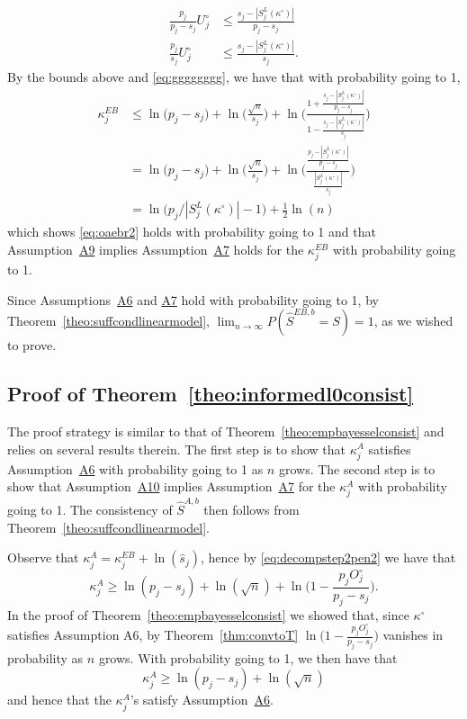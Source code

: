 \documentclass[bj,authoryear]{imsart}
\theoremstyle{plain}
\begin{document}
\begin{align}
    \frac{p_j}{p_j-s_j}U^{\circ}_j &\leq \frac{s_j-|S^{L}_j(\kappa^{\circ})|}{p_j-s_j}\nonumber\\
    \frac{p_j}{s_j}U^{\circ}_j &\leq  \frac{s_j-|S^{L}_j(\kappa^{\circ})|}{s_j}. \label{eq:gewou}
\end{align}
By the bounds above and \eqref{eq:gggggggg}, we have that with probability going to 1,
\begin{align*}
  \kappa^{EB}_j 
  &\leq \ln\big(p_j-s_j\big)+\ln\Big(\frac{\sqrt{n}}{s_j}\Big)+\ln\Bigg(\frac{1+\frac{s_j-|S^{L}_j(\kappa^{\circ})|}{p_j-s_j}}{1- \frac{s_j-|S^{L}_j(\kappa^{\circ})|}{s_j}}\Bigg) \nonumber\\
  &= \ln\big(p_j-s_j\big) + \ln\Big(\frac{\sqrt{n}}{s_j}\Big) + \ln\Bigg(\frac{\frac{p_j-|S^{L}_j(\kappa^{\circ})|}{p_j-s_j}}{ \frac{|S^{L}_j(\kappa^{\circ})|}{s_j}}\Bigg) \\
&=\ln\big(p_j/|S^{L}_j(\kappa^{\circ})|-1\big)+\frac{1}{2}\ln(n)\label{eq:finalupperboundkappaj}
\end{align*}
which shows \eqref{eq:oaebr2} holds with probability going to 1 and that
Assumption~\hyperlink{lab:A9}{A9} implies Assumption~\hyperlink{lab:A7}{A7} holds for the $\kappa^{EB}_j$ with probability going to 1. 

Since Assumptions~\hyperlink{lab:A6}{A6} and \hyperlink{lab:A7}{A7} hold with probability going to 1, by Theorem~\ref{theo:suffcondlinearmodel}, $\lim_{n\to\infty}P(\hat{S}^{EB,b}= S)= 1$, as we wished to prove.

\subsection{Proof of Theorem~\ref{theo:informedl0consist}} The proof strategy is similar to that of Theorem~\ref{theo:empbayesselconsist} and relies on several results therein. The first step is to show that $\kappa^{A}_j$ satisfies Assumption~\hyperlink{lab:A6}{A6} with probability going to 1 as $n$ grows. The second step is to show that Assumption~\hyperlink{lab:A10}{A10} implies Assumption~\hyperlink{lab:A7}{A7} for the $\kappa^{A}_j$ with probability going to 1. The consistency of $\hat S^{A,b}$ then follows from Theorem~\ref{theo:suffcondlinearmodel}.

Observe that $\kappa_j^{A}=\kappa_j^{EB}+\ln(\widehat s_j)$, hence by \eqref{eq:decompstep2pen2} we have that
\begin{equation*}
    \kappa_j^{A}
    \geq  \ln(p_j-s_j)+\ln(\sqrt{n})+\ln\Big(1-\frac{p_j O^{\circ}_j}{p_j-s_j}\Big).
\end{equation*}
In the proof of Theorem~\ref{theo:empbayesselconsist} we showed that, since $\kappa^{\circ}$ satisfies Assumption A6, by Theorem~\ref{thm:convtoT} $\ln\Big(1-\frac{p_j O^{\circ}_j}{p_j-s_j}\Big)$ vanishes in probability as $n$ grows. With probability going to 1, we then have that
\begin{equation}\label{eq:finallowerboundkappaj2}\kappa^{A}_j 
    \geq  \ln(p_j-s_j)+\ln(\sqrt{n})
\end{equation}
and hence that the $\kappa^{A}_j$'s satisfy Assumption~\hyperlink{lab:A6}{A6}.
\end{document}
